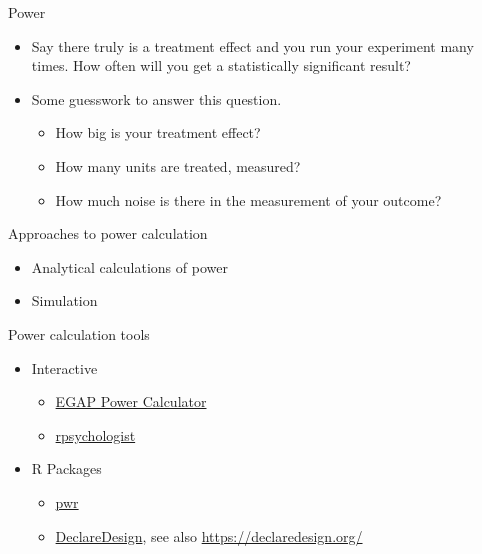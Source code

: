 \documentclass[
  ignorenonframetext,
]{beamer}
\begin{document}
\begin{frame}{Power}
\protect\hypertarget{power}{}
\begin{itemize}
\item
  Say there truly is a treatment effect and you run your experiment many
  times. How often will you get a statistically significant result?
\item
  Some guesswork to answer this question.

  \begin{itemize}
  \item
    How big is your treatment effect?
  \item
    How many units are treated, measured?
  \item
    How much noise is there in the measurement of your outcome?
  \end{itemize}
\end{itemize}
\end{frame}

\begin{frame}{Approaches to power calculation}
\protect\hypertarget{approaches-to-power-calculation}{}
\begin{itemize}
\item
  Analytical calculations of power
\item
  Simulation
\end{itemize}
\end{frame}

\begin{frame}{Power calculation tools}
\protect\hypertarget{power-calculation-tools}{}
\begin{itemize}
\item
  Interactive

  \begin{itemize}
  \item
    \href{https://egap.shinyapps.io/power-app/}{EGAP Power Calculator}
  \item
    \href{https://rpsychologist.com/d3/NHST/}{rpsychologist}
  \end{itemize}
\item
  R Packages

  \begin{itemize}
  \item
    \href{https://cran.r-project.org/web/packages/pwr/index.html}{pwr}
  \item
    \href{https://cran.r-project.org/web/packages/DeclareDesign/index.html}{DeclareDesign},
    see also \url{https://declaredesign.org/}
  \end{itemize}
\end{itemize}
\end{frame}
\end{document}
